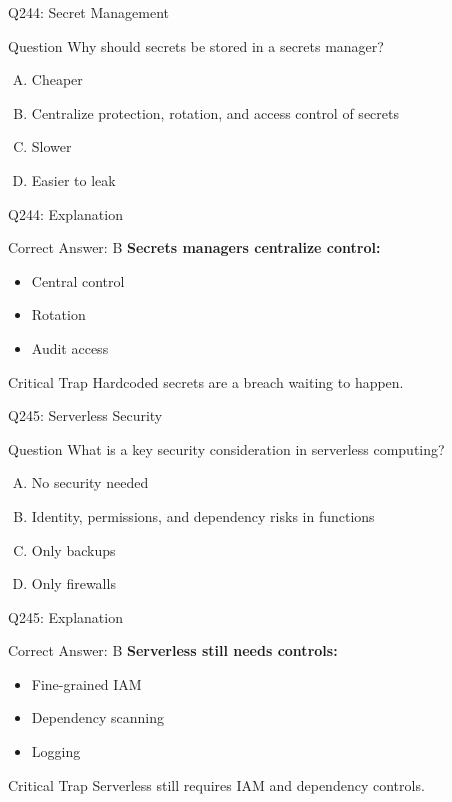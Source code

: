 \documentclass{beamer}
\begin{document}
	\begin{frame}{Q244: Secret Management}
		\begin{block}{Question}
			Why should secrets be stored in a secrets manager?
		\end{block}
		\begin{enumerate}[(A)]
			\item Cheaper
			\item Centralize protection, rotation, and access control of secrets
			\item Slower
			\item Easier to leak
		\end{enumerate}
	\end{frame}
	
	\begin{frame}{Q244: Explanation}
		\begin{block}{Correct Answer: B}
			\textbf{Secrets managers centralize control:}
			\begin{itemize}
				\item Central control
				\item Rotation
				\item Audit access
			\end{itemize}
		\end{block}
		\begin{alertblock}{Critical Trap}
			Hardcoded secrets are a breach waiting to happen.
		\end{alertblock}
	\end{frame}
	
	\begin{frame}{Q245: Serverless Security}
		\begin{block}{Question}
			What is a key security consideration in serverless computing?
		\end{block}
		\begin{enumerate}[(A)]
			\item No security needed
			\item Identity, permissions, and dependency risks in functions
			\item Only backups
			\item Only firewalls
		\end{enumerate}
	\end{frame}
	
	\begin{frame}{Q245: Explanation}
		\begin{block}{Correct Answer: B}
			\textbf{Serverless still needs controls:}
			\begin{itemize}
				\item Fine-grained IAM
				\item Dependency scanning
				\item Logging
			\end{itemize}
		\end{block}
		\begin{alertblock}{Critical Trap}
			Serverless still requires IAM and dependency controls.
		\end{alertblock}
	\end{frame}
	
\end{document}
